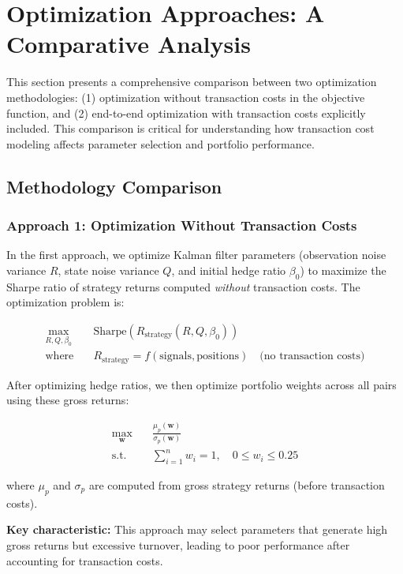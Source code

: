 \section{Optimization Approaches: A Comparative Analysis}

This section presents a comprehensive comparison between two optimization methodologies: (1) optimization without transaction costs in the objective function, and (2) end-to-end optimization with transaction costs explicitly included. This comparison is critical for understanding how transaction cost modeling affects parameter selection and portfolio performance.

\subsection{Methodology Comparison}

\subsubsection{Approach 1: Optimization Without Transaction Costs}

In the first approach, we optimize Kalman filter parameters (observation noise variance $R$, state noise variance $Q$, and initial hedge ratio $\beta_0$) to maximize the Sharpe ratio of strategy returns computed \textit{without} transaction costs. The optimization problem is:

\begin{align}
\max_{R, Q, \beta_0} \quad & \text{Sharpe}(R_{\text{strategy}}(R, Q, \beta_0)) \\
\text{where} \quad & R_{\text{strategy}} = f(\text{signals}, \text{positions}) \quad \text{(no transaction costs)}
\end{align}

After optimizing hedge ratios, we then optimize portfolio weights across all pairs using these gross returns:

\begin{align}
\max_{\mathbf{w}} \quad & \frac{\mu_p(\mathbf{w})}{\sigma_p(\mathbf{w})} \\
\text{s.t.} \quad & \sum_{i=1}^{n} w_i = 1, \quad 0 \leq w_i \leq 0.25
\end{align}

where $\mu_p$ and $\sigma_p$ are computed from gross strategy returns (before transaction costs).

\textbf{Key characteristic:} This approach may select parameters that generate high gross returns but excessive turnover, leading to poor performance after accounting for transaction costs.

